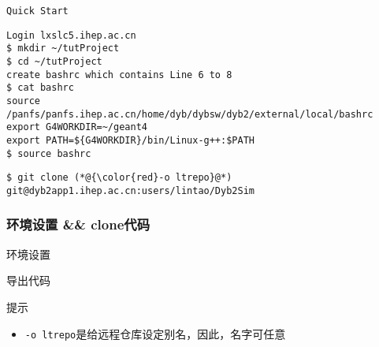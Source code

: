 
\begin{frame}
    \begin{center}
        \LARGE \tt{Quick Start}
    \end{center}
\end{frame}

\newsavebox{\QuickStartEnvSetup}
\begin{lrbox}{\QuickStartEnvSetup}
\begin{lstlisting}
Login lxslc5.ihep.ac.cn
$ mkdir ~/tutProject
$ cd ~/tutProject
create bashrc which contains Line 6 to 8
$ cat bashrc 
source /panfs/panfs.ihep.ac.cn/home/dyb/dybsw/dyb2/external/local/bashrc
export G4WORKDIR=~/geant4
export PATH=${G4WORKDIR}/bin/Linux-g++:$PATH
$ source bashrc
\end{lstlisting}
\end{lrbox}

\newsavebox{\QuickStartGitClone}
\begin{lrbox}{\QuickStartGitClone}
\begin{lstlisting}
$ git clone (*@{\color{red}-o ltrepo}@*) git@dyb2app1.ihep.ac.cn:users/lintao/Dyb2Sim
\end{lstlisting}
\end{lrbox}

\begin{frame}
    \frametitle{环境设置 \&\& clone代码}
    \begin{block}{环境设置}
        \par\usebox{\QuickStartEnvSetup}
    \end{block}
    \begin{block}{导出代码}
        \par\usebox{\QuickStartGitClone}
    \end{block}
    \begin{alertblock}{提示}
        \begin{itemize}    
            \item {\tt -o ltrepo}是给远程仓库设定别名，因此，名字可任意
        \end{itemize}
    \end{alertblock}
\end{frame}

